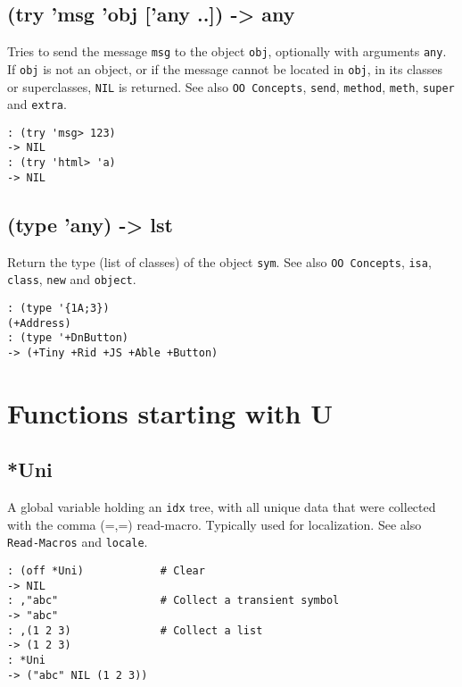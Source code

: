 {{{{{{{{ 
\section{(try 'msg 'obj ['any ..]) -> any}
\label{sec-8-1-20-28}


Tries to send the message \texttt{msg} to the object \texttt{obj}, optionally with
arguments \texttt{any}. If \texttt{obj} is not an object, or if the message cannot be
located in \texttt{obj}, in its classes or superclasses, \texttt{NIL} is returned. See
also \texttt{OO Concepts}, \texttt{send}, \texttt{method}, \texttt{meth}, \texttt{super} and \texttt{extra}.


\begin{verbatim}
: (try 'msg> 123)
-> NIL
: (try 'html> 'a)
-> NIL
\end{verbatim}

 
\section{(type 'any) -> lst}
\label{sec-8-1-20-29}


Return the type (list of classes) of the object \texttt{sym}. See also
\texttt{OO Concepts}, \texttt{isa}, \texttt{class}, \texttt{new} and \texttt{object}.


\begin{verbatim}
: (type '{1A;3})
(+Address)
: (type '+DnButton)
-> (+Tiny +Rid +JS +Able +Button)
\end{verbatim}


\chapter{Functions starting with U}
\label{sec-8-1-21}


 
\section{*Uni}
\label{sec-8-1-21-1}


A global variable holding an \texttt{idx} tree, with all unique data that were
collected with the comma (=,=) read-macro. Typically used for
localization. See also \texttt{Read-Macros} and \texttt{locale}.


\begin{verbatim}
: (off *Uni)            # Clear
-> NIL
: ,"abc"                # Collect a transient symbol
-> "abc"
: ,(1 2 3)              # Collect a list
-> (1 2 3)
: *Uni
-> ("abc" NIL (1 2 3))
\end{verbatim}

}}}}}}}}
